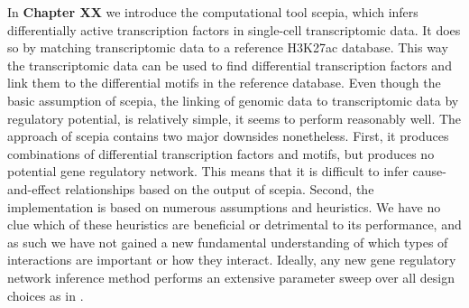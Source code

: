 In \textbf{Chapter XX} we introduce the computational tool scepia, which infers differentially active transcription factors in single-cell transcriptomic data. It does so by matching transcriptomic data to a reference H3K27ac database. This way the transcriptomic data can be used to find differential transcription factors and link them to the differential motifs in the reference database. Even though the basic assumption of scepia, the linking of genomic data to transcriptomic data by regulatory potential\cite{Wang2016}, is relatively simple, it seems to perform reasonably well. The approach of scepia contains two major downsides nonetheless. First, it produces combinations of differential transcription factors and motifs, but produces no potential gene regulatory network. This means that it is difficult to infer cause-and-effect relationships based on the output of scepia. Second, the implementation is based on numerous assumptions and heuristics. We have no clue which of these heuristics are beneficial or detrimental to its performance, and as such we have not gained a new fundamental understanding of which types of interactions are important or how they interact. Ideally, any new gene regulatory network inference method performs an extensive parameter sweep over all design choices as in \cite{Gschwind2023}.

